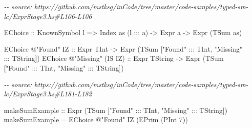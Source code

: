 \documentclass[]{article}
\newenvironment{Shaded}{}{}
\newcommand{\CommentTok}[1]{\textcolor[rgb]{0.38,0.63,0.69}{\textit{#1}}}
\newcommand{\DataTypeTok}[1]{\textcolor[rgb]{0.56,0.13,0.00}{#1}}
\newcommand{\DecValTok}[1]{\textcolor[rgb]{0.25,0.63,0.44}{#1}}
\newcommand{\NormalTok}[1]{#1}
\newcommand{\OperatorTok}[1]{\textcolor[rgb]{0.40,0.40,0.40}{#1}}
\newcommand{\OtherTok}[1]{\textcolor[rgb]{0.00,0.44,0.13}{#1}}
\newcommand{\StringTok}[1]{\textcolor[rgb]{0.25,0.44,0.63}{#1}}
\begin{document}
\begin{Shaded}
\begin{Highlighting}[]
\CommentTok{{-}{-} source: https://github.com/mstksg/inCode/tree/master/code{-}samples/typed{-}sm{-}lc/ExprStage3.hs\#L106{-}L106}

  \DataTypeTok{EChoice}\OtherTok{ ::} \DataTypeTok{KnownSymbol}\NormalTok{ l }\OtherTok{=\textgreater{}} \DataTypeTok{Index}\NormalTok{ as (l }\OperatorTok{:::}\NormalTok{ a) }\OtherTok{{-}\textgreater{}} \DataTypeTok{Expr}\NormalTok{ a }\OtherTok{{-}\textgreater{}} \DataTypeTok{Expr}\NormalTok{ (}\DataTypeTok{TSum}\NormalTok{ as)}
\end{Highlighting}
\end{Shaded}

\begin{Shaded}
\begin{Highlighting}[]
\DataTypeTok{EChoice} \OperatorTok{@}\StringTok{"Found"} \DataTypeTok{IZ}\OtherTok{        ::} \DataTypeTok{Expr} \DataTypeTok{TInt} \OtherTok{{-}\textgreater{}} \DataTypeTok{Expr}\NormalTok{ (}\DataTypeTok{TSum}\NormalTok{ [}\StringTok{"Found"} \OperatorTok{:::} \DataTypeTok{TInt}\NormalTok{, }\StringTok{"Missing"} \OperatorTok{:::} \DataTypeTok{TString}\NormalTok{])}
\DataTypeTok{EChoice} \OperatorTok{@}\StringTok{"Missing"}\NormalTok{ (}\DataTypeTok{IS} \DataTypeTok{IZ}\NormalTok{)}\OtherTok{ ::} \DataTypeTok{Expr} \DataTypeTok{TString} \OtherTok{{-}\textgreater{}} \DataTypeTok{Expr}\NormalTok{ (}\DataTypeTok{TSum}\NormalTok{ [}\StringTok{"Found"} \OperatorTok{:::} \DataTypeTok{TInt}\NormalTok{, }\StringTok{"Missing"} \OperatorTok{:::} \DataTypeTok{TString}\NormalTok{])}
\end{Highlighting}
\end{Shaded}

\begin{Shaded}
\begin{Highlighting}[]
\CommentTok{{-}{-} source: https://github.com/mstksg/inCode/tree/master/code{-}samples/typed{-}sm{-}lc/ExprStage3.hs\#L181{-}L182}

\OtherTok{makeSumExample ::} \DataTypeTok{Expr}\NormalTok{ (}\DataTypeTok{TSum}\NormalTok{ [}\StringTok{"Found"} \OperatorTok{:::} \DataTypeTok{TInt}\NormalTok{, }\StringTok{"Missing"} \OperatorTok{:::} \DataTypeTok{TString}\NormalTok{])}
\NormalTok{makeSumExample }\OtherTok{=} \DataTypeTok{EChoice} \OperatorTok{@}\StringTok{"Found"} \DataTypeTok{IZ}\NormalTok{ (}\DataTypeTok{EPrim}\NormalTok{ (}\DataTypeTok{PInt} \DecValTok{7}\NormalTok{))}
\end{Highlighting}
\end{Shaded}
\end{document}
